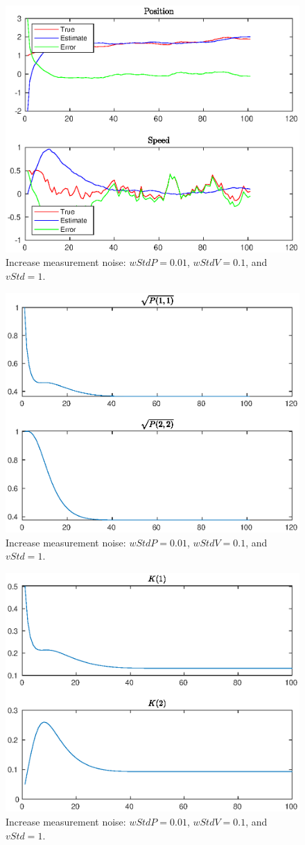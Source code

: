 \documentclass[11pt,a4paper]{article}
\begin{document}
\begin{itemize}
		\begin{figure}[H]
			\centering
			\includegraphics[width=0.57\columnwidth]{Warmup_Figure_1_wP_0_01_wV_0_1_vP_1.eps}
			\caption{Increase measurement noise: $wStdP = 0.01$, $wStdV = 0.1$, and $vStd = 1$.}
			\label{fig:Warmup_Figure_1_wP_0_01_wV_0_1_vP_1}
		\end{figure}
			
		\begin{figure}[H]
			\centering
			\includegraphics[width=0.57\columnwidth]{Warmup_Figure_2_wP_0_01_wV_0_1_vP_1.eps}
			\caption{Increase measurement noise: $wStdP = 0.01$, $wStdV = 0.1$, and $vStd = 1$.}
			\label{fig:Warmup_Figure_2_wP_0_01_wV_0_1_vP_1}
		\end{figure}
		
		\begin{figure}[H]
			\centering
			\includegraphics[width=0.57\columnwidth]{Warmup_Figure_3_wP_0_01_wV_0_1_vP_1.eps}
			\caption{Increase measurement noise: $wStdP = 0.01$, $wStdV = 0.1$, and $vStd = 1$.}
			\label{fig:Warmup_Figure_3_wP_0_01_wV_0_1_vP_1}
		\end{figure}
		

\end{itemize}
\end{document}
